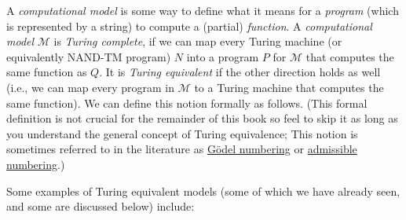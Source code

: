 A \emph{computational model} is some way to define what it means for a
\emph{program} (which is represented by a string) to compute a (partial)
\emph{function}. A \emph{computational model} \(\mathcal{M}\) is
\emph{Turing complete}, if we can map every Turing machine (or
equivalently NAND-TM program) \(N\) into a program \(P\) for
\(\mathcal{M}\) that computes the same function as \(Q\). It is
\emph{Turing equivalent} if the other direction holds as well (i.e., we
can map every program in \(\mathcal{M}\) to a Turing machine that
computes the same function). We can define this notion formally as
follows. (This formal definition is not crucial for the remainder of
this book so feel to skip it as long as you understand the general
concept of Turing equivalence; This notion is sometimes referred to in
the literature as \href{https://goo.gl/rzuNPu}{Gödel numbering} or
\href{https://goo.gl/xXJoUG}{admissible numbering}.)

\hypertarget{turingcompletedef}{}

Some examples of Turing equivalent models (some of which we have already
seen, and some are discussed below) include:

